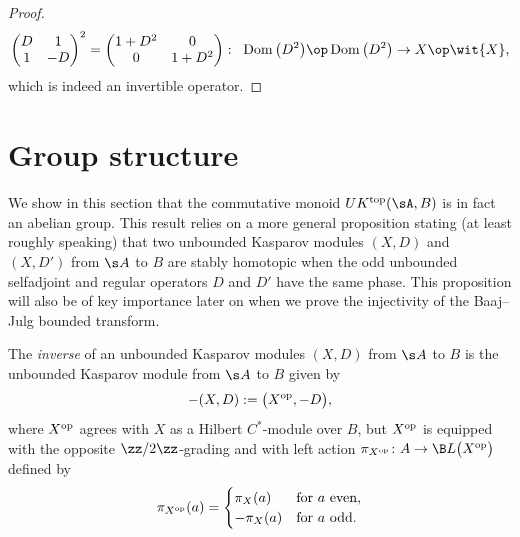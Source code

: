 \begin{proof}
\[
\left(\begin{matrix} D & 1 \\ 1 & - D\end{matrix}\right)^2 = \left(\begin{matrix} 1 + D^2 & 0 \\ 0 & 1 + D^2 \end{matrix}\right)\colon \ \operatorname{Dom}\big(D^2\big) \op \operatorname{Dom}\big(D^2\big) \to X \op \wit{X} ,
\]
which is indeed an invertible operator.
\end{proof}

\section{Group structure}\label{s:group}
We show in this section that the commutative monoid $UK^{{\rm top}}(\sA,B)$ is in fact an abelian group. This result relies on a more general proposition stating (at least roughly speaking) that two unbounded Kasparov modules $(X,D)$ and $(X,D')$ from $\s A$ to $B$ are stably homotopic when the odd unbounded selfadjoint and regular operators $D$ and $D'$ have the same phase. This proposition will also be of key importance later on when we prove the injectivity of the Baaj--Julg bounded transform.

\begin{dfn}\label{d:inv}The \emph{inverse} of an unbounded Kasparov modules $(X,D)$ from $\s A$ to $B$ is the unbounded Kasparov module from $\s A$ to $B$ given by
\[
-(X,D) := \big( X^{{\rm op}},-D\big) ,
\]
where $X^{{\rm op}}$ agrees with $X$ as a Hilbert $C^*$-module over $B$, but $X^{{\rm op}}$ is equipped with the opposite $\zz/2\zz$-grading and with left action $\pi_{X^{{\rm op}}}\colon A \to \B L\big(X^{{\rm op}}\big)$ defined by
\[
\pi_{X^{{\rm op}}}(a) = \begin{cases} \pi_X(a) & \mbox{for} \ a \mbox{ even}, \\ -\pi_X(a) & \mbox{for} \ a \mbox{ odd}.\end{cases}
\]
\end{dfn}

